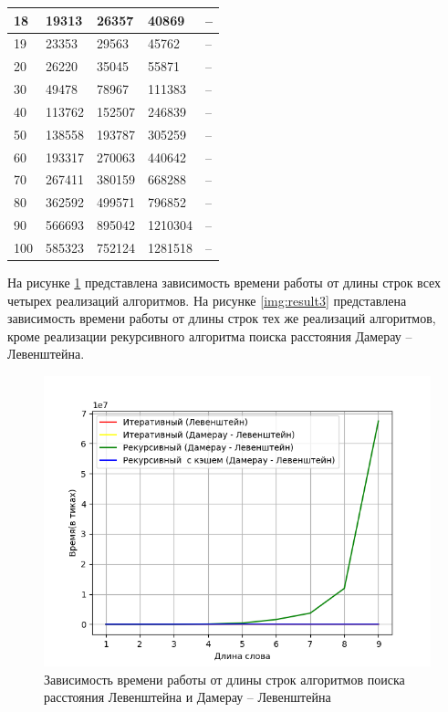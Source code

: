 \begin{table}[h]
\begin{center}
\begin{tabular}{|l|l|l|l|l|}
		18  & 19313  & 26357  & 40869   & --        \\\hline
		19  & 23353  & 29563  & 45762   & --        \\\hline
		20  & 26220  & 35045  & 55871   & --        \\\hline
		30  & 49478  & 78967  & 111383  & --        \\\hline
		40  & 113762 & 152507 & 246839  & --        \\\hline
		50  & 138558 & 193787 & 305259  & --       \\\hline
		60  & 193317 & 270063 & 440642  & --        \\\hline
		70  & 267411 & 380159 & 668288  & --        \\\hline
		80  & 362592 & 499571 & 796852  & --        \\\hline
		90  & 566693 & 895042 & 1210304 & --      \\\hline
		100 & 585323 & 752124 & 1281518 & --		   \\\hline
	\end{tabular}
	\end{center}
\end{table}

На рисунке \ref{img:result4} представлена зависимость времени работы от длины строк всех четырех реализаций алгоритмов. На рисунке \ref{img:result3} представлена зависимость времени работы от длины строк тех же реализаций алгоритмов, кроме реализации рекурсивного алгоритма поиска расстояния Дамерау -- Левенштейна.

\begin{figure}[h]
	\centering
	\includegraphics[width=140mm]{result4}
	\caption{Зависимость времени работы от длины строк алгоритмов поиска расстояния Левенштейна и Дамерау -- Левенштейна}
	\label{img:result4}
\end{figure}

